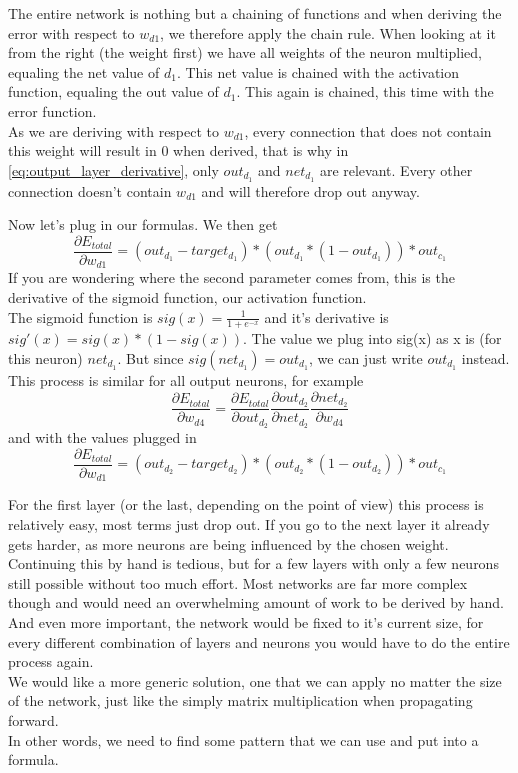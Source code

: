 \documentclass[11pt, halfparskip]{article}
\begin{document}
    The entire network is nothing but a chaining of functions and when deriving the error with respect to $w_{d1}$, we therefore apply the chain rule. When looking at it from the right 
    (the weight first) we have all weights of the neuron multiplied, equaling the net value of $d_1$. This net value is chained with the activation function, equaling the out value of $d_1$.
    This again is chained, this time with the error function.\\
    As we are deriving with respect to $w_{d1}$, every connection that does not contain this weight will result in 0 when derived, that is why in \ref{eq:output_layer_derivative}, only
    $out_{d_1}$ and $net_{d_1}$ are relevant. Every other connection doesn't contain $w_{d1}$ and will therefore drop out anyway.
    
    \noindent \newline
    Now let's plug in our formulas. We then get
    \[
    	\frac{\partial E_{total}}{\partial w_{d1}} = (out_{d_1} - target_{d_1}) * (out_{d_1} * (1 - out_{d_1})) * out_{c_1}
    \]
    If you are wondering where the second parameter comes from, this is the derivative of the sigmoid function, our activation function.\\
    The sigmoid function is $sig(x) = \frac{1}{1 + e^{-x}}$ and it's derivative is \\$sig'(x) = sig(x) * (1 - sig(x))$. The value we plug into sig(x) as x is (for this neuron) $net_{d_1}$.
    But since $sig(net_{d_1}) = out_{d_1}$, we can just write $out_{d_1}$ instead.\\
    This process is similar for all output neurons, for example 
    \[
    	\frac{\partial E_{total}}{\partial w_{d4}} = \frac{\partial E_{total}}{\partial out_{d_2}} \frac{\partial out_{d_2}}{\partial net_{d_2}} \frac{\partial net_{d_2}}{\partial w_{d4}}
    \]
    and with the values plugged in
    \[
    	\frac{\partial E_{total}}{\partial w_{d1}} = (out_{d_2} - target_{d_2}) * (out_{d_2} * (1 - out_{d_2})) * out_{c_1}
    \]
    
    \noindent \newline
    For the first layer (or the last, depending on the point of view) this process is relatively easy, most terms just drop out. If you go to the next layer it already gets harder, as more
    neurons are being influenced by the chosen weight. Continuing this by hand is tedious, but for a few layers with only a few neurons still possible without too much effort. Most
    networks are far more complex though and would need an overwhelming amount of work to be derived by hand. And even more important, the network would be fixed to it's current
    size, for every different combination of layers and neurons you would have to do the entire process again.\\
    We would like a more generic solution, one that we can apply no matter the size of the network, just like the simply matrix multiplication when propagating forward.\\
    In other words, we need to find some pattern that we can use and put into a formula.
    
\end{document}
